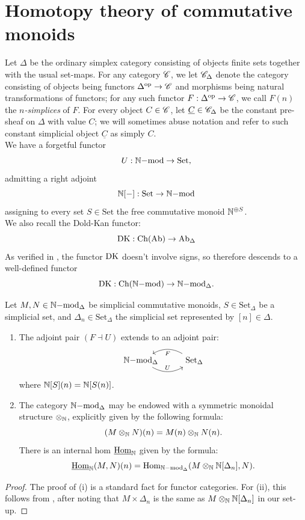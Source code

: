 \section{Homotopy theory of commutative monoids}
\indent Let $\Delta$ be the ordinary simplex category consisting of objects finite sets together with the usual set-maps.
For any category $\mathscr{C}$, we let $\mathscr{C}_{\Delta}$ denote the category consisting of objects being functors $\Delta^{\text{op}} \rightarrow \mathscr{C}$ and morphisms being 
natural transformations of functors; for any such functor $F: \Delta^{\text{op}} \rightarrow \mathscr{C}$, we call $F(n)$ the \textit{$n$-simplices} of $F$. For every object $C \in \mathscr{C}$, let $\underline{C} \in \mathscr{C}_{\Delta}$ be the constant pre-sheaf on $\Delta$ with value $C$; we will sometimes abuse notation and refer to such constant simplicial object $\underline{C}$ as simply $C$.\\
\indent We have a forgetful functor
\[U:\mathbb{N}\mathrm{-mod} \rightarrow \text{Set},\]
admitting a right adjoint
\[\mathbb{N}[-]:\mathrm{Set} \rightarrow \mathbb{N}\mathrm{-mod}\] 
assigning to every set $S \in \text{Set}$ the free commutative monoid $\mathbb{N}^{\oplus S}$. \\

\indent We also recall the Dold-Kan functor:
\[\operatorname{DK}:\text{Ch}(\mathrm{Ab}) \rightarrow \mathrm{Ab}_{\Delta}\]
As verified in \cite[III.2]{simpho}, the functor $\operatorname{DK}$ doesn't involve signs, so therefore descends to a well-defined functor
\[\operatorname{DK}:\text{Ch}(\mathbb{N}\mathrm{-mod}) \rightarrow {\mathbb{N}\mathrm{-mod}}_{\Delta}.\]
\begin{proposition}\label{prop:simpN}
Let $M,N \in \mathbb{N}\mathrm{-mod}_{\Delta}$ be simplicial commutative monoids, $S \in \mathrm{Set}_{\Delta}$ be a simplicial set, and $\Delta_{n}\in \mathrm{Set}_{\Delta}$ the simplicial set represented by $[n] \in \Delta$.
\begin{enumerate}
\item[(i)] The adjoint pair $(F \dashv U)$ extends to an adjoint pair:
\[\begin{tikzcd} \bb{N}\mathrm{-mod}_{\Delta} \arrow[r, bend right, "U"] & \text{Set}_{\Delta} \arrow[l, bend right, "F"]\end{tikzcd}\]
where $\mathbb{N}[S](n)=\mathbb{N}[S(n)]$.
\item[(ii)] The category $\mathbb{N}\mathrm{-mod}_{\Delta}$ may be endowed with a symmetric monoidal structure $\otimes_{\mathbb{N}}$, explicitly given by the following formula:
\[(M \otimes_{\mathbb{N}} N)(n) = M(n) \otimes_{\mathbb{N}} N(n).\]
There is an internal hom $\underline{\operatorname{Hom}}_{\mathbb{N}}$ given by the formula:
\[\underline{\operatorname{Hom}}_{\mathbb{N}}(M,N)(n) = \operatorname{Hom}_{\mathbb{N}\mathrm{-mod}_{\Delta}}(M \otimes_{\mathbb{N}}\mathbb{N}[\Delta_n],N).\]
 \end{enumerate}
 \end{proposition}
 \begin{proof}
 The proof of (i) is a standard fact for functor categories. For (ii), this follows from \cite[Tag017H]{sp}, after noting that $M \times \Delta_n$ is the same as $M \otimes_{\mathbb{N}}\mathbb{N}[\Delta_n]$ in our set-up.
 \end{proof}

